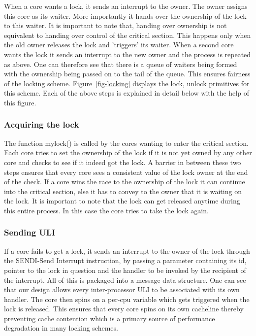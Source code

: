 When a core wants a lock, it sends an interrupt to the owner. The owner assigns
this core as its waiter. More importantly it hands over the ownership of the
lock to this waiter. It is important to note that, handing over ownership is not
equivalent to handing over control of the critical section. This happens only
when the old owner releases the lock and 'triggers' its waiter. When a second
core wants the lock it sends an interrupt to the new owner and the process is
repeated as above. One can therefore see that there is a queue of waiters being
formed with the ownership being passed on to the tail of the queue. This ensures
fairness of the locking scheme. Figure~\ref{fig-locking} displays the lock,
unlock primitives for this scheme. Each of the above steps is explained in
detail below with the help of this figure.

\subsubsection{Acquiring the lock}

The function mylock() is called by the cores wanting to enter the critical
section. Each core tries to set the ownership of the lock if it is not yet owned
by any other core and checks to see if it indeed got the lock. A barrier in
between these two steps ensures that every core sees a consistent value of the
lock owner at the end of the check. If a core wins the race to the ownership of
the lock it can continue into the critical section, else it has to convey to the
owner that it is waiting on the lock. It is important to note that the lock can
get released anytime during this entire process. In this case the core tries to
take the lock again.

\subsubsection{Sending ULI}

If a core fails to get a lock, it sends an interrupt to the owner of the lock
through the SENDI-Send Interrupt instruction, by passing a parameter containing
its id, pointer to the lock in question and the handler to be invoked by the
recipient of the interrupt. All of this is packaged into a message data
structure. One can see that our design allows every inter-processor ULI to be
associated with its own handler.  The core then spins on a per-cpu variable
which gets triggered when the lock is released. This ensures that every core
spins on its own cacheline thereby preventing cache contention which is a
primary source of performance degradation in many locking schemes.

